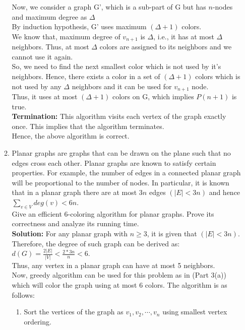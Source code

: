 \documentclass[12pt]{article}
\begin{document}
\begin{enumerate}
\begin{enumerate}
Now, we consider a graph G', which is a sub-part of G but has $n$-nodes and maximum degree as $\Delta$\\
By induction hypothesis, G' uses maximum $(\Delta+1)$ colors.\\
We know that, maximum degree of $v_{n+1}$ is $\Delta$, i.e., it has at most $\Delta$ neighbors. Thus, at most $\Delta$ colors are assigned to its neighbors and we cannot use it again.\\
So, we need to find the next smallest color which is not used by it's neighbors. Hence, there exists a color in a set of $(\Delta + 1)$ colors which is not used by any $\Delta$ neighbors and it can be used for $v_{n+1}$ node.\\
Thus, it uses at most $(\Delta+1)$ colors on G, which implies $P(n+1)$ is true.\\
\textbf{Termination:} This algorithm visits each vertex of the graph exactly once. This implies that the algorithm terminates.\\ 
Hence, the above algorithm is correct.\\
\item Planar graphs are graphs that can be drawn on the plane such that no edges cross each other. Planar graphs are known to satisfy certain properties. For example, the number of edges in a connected planar graph will be proportional to the number of nodes. In particular, it is known that in a planar graph there are at most $3n$ edges $(|E| < 3n) $ and hence $\sum_{v \in V} deg(v) < 6n$.\\
Give an efficient 6-coloring algorithm for planar graphs. Prove its correctness and analyze its running time.\\
\textbf{Solution:} For any planar graph with $n \ge 3$, it is given that $(|E| < 3n) $.\\
Therefore, the degree of such graph can be derived as: \\ 
$\displaystyle{d(G) = \frac{2|E|}{|V|} < \frac{2*3n}{n} <6}$.\\
Thus, any vertex in a planar graph can have at most 5 neighbors.\\
Now, greedy algorithm can be used for this problem as in (Part 3(a)) which will color the graph using at most 6 colors. The algorithm is as follows:\\
\begin{enumerate}
\item Sort the vertices of the graph as $v_1,v_2,\cdots,v_n$ using smallest vertex ordering.\\

\end{enumerate}
\end{enumerate}
\end{enumerate}
\end{document}
